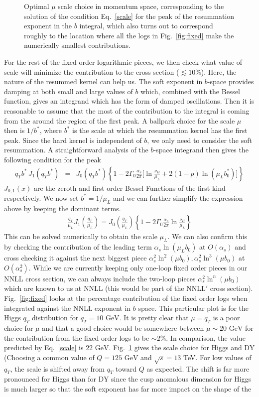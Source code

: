 \documentclass[a4,letterpaper,11pt]{article}
\newcommand{\bea}{\begin{eqnarray}}
\newcommand{\eea}{\end{eqnarray}}
\newcommand{\GeV}{\text{ GeV}}
\newcommand{\as}{\alpha_s}
\newcommand{\eq}[1]{Eq.~\eqref{#1}}
\newcommand{\fig}[1]{Fig.~\ref{fig:#1}}
\begin{document}
\begin{figure}
\centerline{}
\vskip-0.5cm
\caption[1]{Optimal $\mu$ scale choice in momentum space, corresponding to the solution of the condition \eq{scale} for the peak of the resummation exponent in the $b$ integral, which also turns out to correspond roughly to the location where all the logs in \fig{fixed} make the numerically smallest contributions.}
\label{fig:scaleL} 
\end{figure}


For the rest of the fixed order logarithmic pieces, we then check what value of scale  will minimize the contribution to the cross section ($\lesssim 10 \% $). 
Here, the nature of the resummed kernel can help us. 
The soft exponent in $b$-space provides damping at both small and large values of $b$ which, combined with the Bessel function, gives an integrand which has the form of damped oscillations. Then it is reasonable to assume that the most of the contribution to the integral is coming from the around the region of the first peak.
 A ballpark choice for the scale $\mu$ then is $1/b^*$, where $b^*$ is the scale at which the resummation kernel has the first peak. Since the hard kernel is independent of $b$, we only need to consider the soft resummation.  A straightforward analysis of the $b$-space integrand 
then gives the following condition for the peak 
\bea
q_T b^* \, J_1(q_T b^*) 
&=& J_0( q_T b^*)\left \{ 1- 2\Gamma_0 \frac{\as}{2\pi} \Bigg[\ln \frac{\nu_H}{\mu_L} 
 +2(1-p)\ln(\mu_L b_0^*) \Bigg]\right \}  
\eea
$J_{0,1}(x)$ are the zeroth and first order Bessel Functions of the first kind respectively. 
We now set $b^*=1/\mu_L$ and we can further simplify the expression above by keeping the dominant terms.
\bea
 \frac{q_T}{\mu_L}J_1\left(\frac{q_T}{\mu_L}\right) = J_0\left(\frac{q_T}{\mu_L}\right)\left \{ 1-2\Gamma_0 \frac{\as}{2\pi}
 \ln \frac{\nu_H}{\mu_L} \right \}
\label{scale}
\eea
This can be solved numerically to obtain the scale $\mu_L$.
We  can also confirm this by checking the contribution of the leading term $\as \ln(\mu_L b_0)$ at $O(\as)$  and cross checking it against the next biggest piece $ \as^2 \ln^2(\mu b_0),  \as^2 \ln^3(\mu b_0)$ at $O(\as^2)$. 
While we are currently keeping only one-loop fixed order pieces in our NNLL cross section, we can always include the two-loop pieces $\as^2 \ln^n(\mu b_0)$ which are known to us at NNLL (this would be part of the NNLL$'$ cross section).
\fig{fixed} looks at the percentage contribution of the fixed order logs when integrated against the NNLL exponent in $b$ space. This particular plot is for the Higgs $q_T$ distribution for $q_T = 10 \GeV$. It is pretty clear that $\mu =q_T$ is a poor choice for $\mu$ and that a good choice would be somewhere between $\mu \sim 20 \GeV$ for the contribution from the fixed order logs to be $\sim 2 \%$. In comparison, the value predicted by \eq{scale} is $22 \GeV$. \fig{scaleL} gives the scale choice for Higgs and DY (Choosing a common value of $Q=125 \GeV$ and $\sqrt{s}= 13$ TeV. For low values of $q_T$, the scale is shifted away from $q_T$ toward $Q$ as expected. The shift is far more pronounced for Higgs than for DY since the cusp anomalous dimension for Higgs is much larger so that the soft exponent has far more impact on the shape of the 
\end{document}
